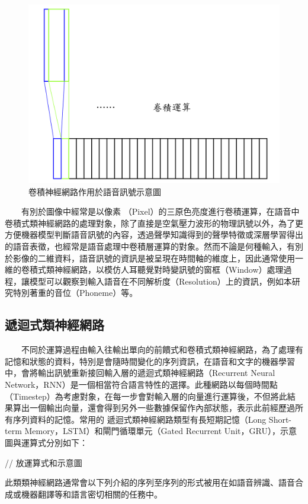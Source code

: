 \begin{figure}
    \centering
    \includegraphics[width=0.5\linewidth]{figures/speechCNN.png}
    \caption{卷積神經網路作用於語音訊號示意圖}
    \label{fig:speech-cnn}
\end{figure}

　　有別於圖像中經常是以像素 （Pixel）的三原色亮度進行卷積運算，在語音中卷積式類神經網路的處理對象，除了直接是空氣壓力波形的物理訊號以外，為了更方便機器模型判斷語音訊號的內容，透過聲學知識得到的聲學特徵或深層學習得出的語音表徵，也經常是語音處理中卷積層運算的對象。然而不論是何種輸入，有別於影像的二維資料，語音訊號的資訊是被呈現在時間軸的維度上，因此通常使用一維的卷積式類神經網路，以模仿人耳聽覺對時變訊號的窗框（Window）處理過程，讓模型可以觀察到輸入語音在不同解析度（Resolution）上的資訊，例如本研究特別著重的音位（Phoneme）等。



\subsection{遞迴式類神經網路}

　　不同於運算過程由輸入往輸出單向的前饋式和卷積式類神經網路，為了處理有記憶和狀態的資料，特別是會隨時間變化的序列資訊，在語音和文字的機器學習中，會將輸出訊號重新接回輸入層的遞迴式類神經網路（Recurrent Neural Network，RNN）是一個相當符合語言特性的選擇。此種網路以每個時間點（Timestep）為考慮對象，在每一步會對輸入層的向量進行運算後，不但將此結果算出一個輸出向量，還會得到另外一些數據保留作內部狀態，表示此前經歷過所有序列資料的記憶。常用的 遞迴式類神經網路類型有長短期記憶（Long Short-term Memory，LSTM）和閘門循環單元（Gated Recurrent Unit，GRU），示意圖與運算式分別如下：



// 放運算式和示意圖

此類類神經網路通常會以下列介紹的序列至序列的形式被用在如語音辨識、語音合成或機器翻譯等和語言密切相關的任務中。

